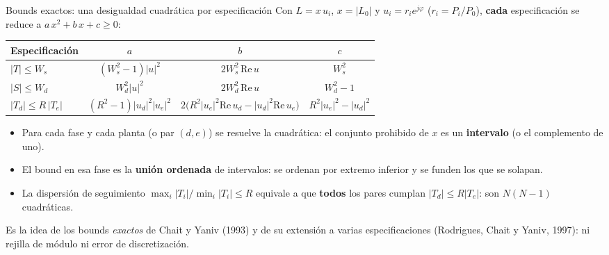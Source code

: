 \documentclass[aspectratio=169,11pt]{beamer}
\begin{document}
\begin{frame}{Bounds exactos: una desigualdad cuadrática por especificación}
  \small
  Con $L=x\,u_i$, $x=|L_0|$ y $u_i=r_i e^{j\varphi}$ ($r_i=P_i/P_0$), \textbf{cada} especificación se reduce a $a\,x^2+b\,x+c\ge0$:
  \begin{center}\footnotesize
  \begin{tabular}{lccc}
    \hline
    Especificación & $a$ & $b$ & $c$\\
    \hline
    $|T|\le W_s$ & $(W_s^2-1)|u|^2$ & $2W_s^2\,\mathrm{Re}\,u$ & $W_s^2$\\
    $|S|\le W_d$ & $W_d^2|u|^2$ & $2W_d^2\,\mathrm{Re}\,u$ & $W_d^2-1$\\
    $|T_d|\le R\,|T_e|$ & $(R^2-1)|u_d|^2|u_e|^2$ & $2\big(R^2|u_e|^2\mathrm{Re}\,u_d-|u_d|^2\mathrm{Re}\,u_e\big)$ & $R^2|u_e|^2-|u_d|^2$\\
    \hline
  \end{tabular}
  \end{center}
  \begin{itemize}
    \item Para cada fase y cada planta (o par $(d,e)$) se resuelve la cuadrática: el conjunto prohibido de $x$ es un \textbf{intervalo} (o el complemento de uno).
    \item El bound en esa fase es la \textbf{unión ordenada} de intervalos: se ordenan por extremo inferior y se funden los que se solapan.
    \item La dispersión de seguimiento $\max_i|T_i|/\min_i|T_i|\le R$ equivale a que \textbf{todos} los pares cumplan $|T_d|\le R|T_e|$: son $N(N-1)$ cuadráticas.
  \end{itemize}
  \footnotesize Es la idea de los bounds \emph{exactos} de Chait y Yaniv (1993) y de su extensión a varias especificaciones (Rodrigues, Chait y Yaniv, 1997): ni rejilla de módulo ni error de discretización.
\end{frame}
\end{document}
